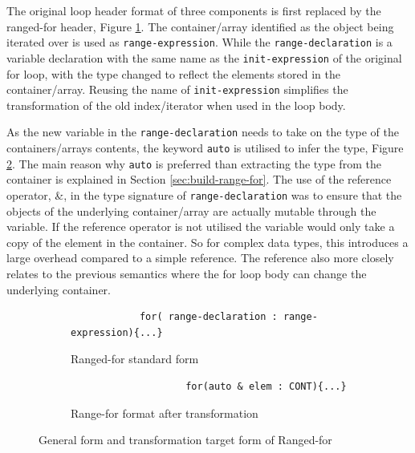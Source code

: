 \documentclass[bsc,frontabs,singlespacing,twoside,parskip,deptreport]{infthesis}
\begin{document}
The original loop header format of three components is first replaced by the ranged-for header, Figure \ref{fig:range-for-header-form}. The container/array identified as the object being iterated over is used as \texttt{range-expression}. While the \texttt{range-declaration} is a variable declaration with the same name as the \texttt{init-expression} of the original for loop, with the type changed to reflect the elements stored in the container/array. Reusing the name of \texttt{init-expression} simplifies the transformation of the old index/iterator when used in the loop body.
 
As the new variable in the \texttt{range-declaration} needs to take on the type of the containers/arrays contents, the keyword \texttt{auto} is utilised to infer the type, Figure \ref{fig:range-for-header}. The main reason why \texttt{auto} is preferred than extracting the type from the container is explained in Section \ref{sec:build-range-for}. The use of the reference operator, \&, in the type signature of \texttt{range-declaration} was to ensure that the objects of the underlying container/array are actually mutable through the variable. If the reference operator is not utilised the variable would only take a copy of the element in the container. So for complex data types, this introduces a large overhead compared to a simple reference. The reference also more closely relates to the previous semantics where the for loop body can change the underlying container.
 
\begin{figure}[h]
    \centering
  
  \begin{subfigure}[h]{\textwidth}
        \centering
        \begin{verbatim}
            for( range-declaration : range-expression){...}
        \end{verbatim}
        \caption{Ranged-for standard form}
        \label{fig:range-for-header-form}
        \vspace{0.40cm}
    \end{subfigure}

    \begin{subfigure}[h]{\textwidth}
    \begin{verbatim}
                    for(auto & elem : CONT){...}
    \end{verbatim}
    \caption{Range-for format after transformation}
    \centering
    \label{fig:range-for-header}
    \end{subfigure}

    \caption{General form and transformation target form of Ranged-for}
    \label{fig:code-for-headers}
\end{figure}
\end{document}
